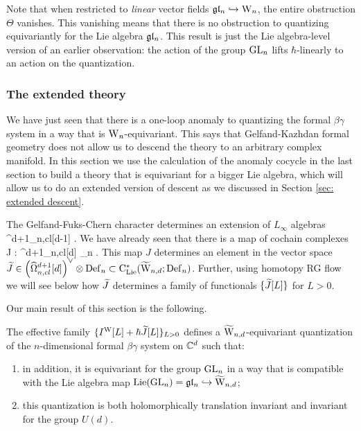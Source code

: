 \documentclass[10pt]{amsart}
\begin{document}
\begin{rmk} 
Note that when restricted to {\em linear} vector fields $\gl_n \hookrightarrow \Vect$, 
the entire obstruction $\Theta$ vanishes. 
This vanishing means that there is no obstruction to quantizing equivariantly for the Lie algebra $\gl_n$. 
This result is just the Lie algebra-level version of an earlier observation: 
the action of the group $\GL_n$ lifts $\hbar$-linearly to an action on the quantization.
\end{rmk}

\subsubsection{The extended theory}

We have just seen that there is a one-loop anomaly to quantizing the formal $\beta\gamma$ system in a way that is $\Vect$-equivariant. 
This says that Gelfand-Kazhdan formal geometry does not allow us to descend the theory to an arbitrary complex manifold. 
In this section we use the calculation of the anomaly cocycle in the last section to build a theory that is equivariant for a bigger Lie algebra, which will allow us to do an extended version of descent as we discussed in Section \ref{sec: extended descent}. 

The Gelfand-Fuks-Chern character determines an extension of $L_\infty$ algebras
 \to \hOmega^{d+1}_{n,cl}[d-1] \to \TVectd {} \Vect {} .
\een
We have already seen that there is a map of cochain complexes
\ben
J : \hOmega^{d+1}_{n,cl}[d] \to \Def_n .
\een
This map $J$ determines an element in the vector space $\Tilde{J} \in \left(\hOmega^{d+1}_{n,cl} [d]\right)^\vee \tensor \Def_n \subset \clie^*(\TVectd ; \Def_n)$.
Further, using homotopy RG flow we will see below how $\Tilde{J}$ determines a family of functionals $\{\Tilde{J}[L]\}$ for $L > 0$.

Our main result of this section is the following. 

\begin{thm}\label{thm: extended quantization}
The effective family $\{I^{\rm W}[L] + \hbar \Tilde{J} [L]\}_{L>0}$ defines a $\TVectd$-equivariant quantization of the $n$-dimensional formal $\beta\gamma$ system on $\CC^d$ such that:
\begin{enumerate}
\item in addition, it is equivariant for the group $\GL_n$ in a way that is compatible with the Lie algebra map ${\rm Lie}(\GL_n) = \gl_n \hookrightarrow \TVectd$;
\item this quantization is both holomorphically translation invariant and invariant for the group $U(d)$.
\end{enumerate}
\end{thm}
\end{document}
